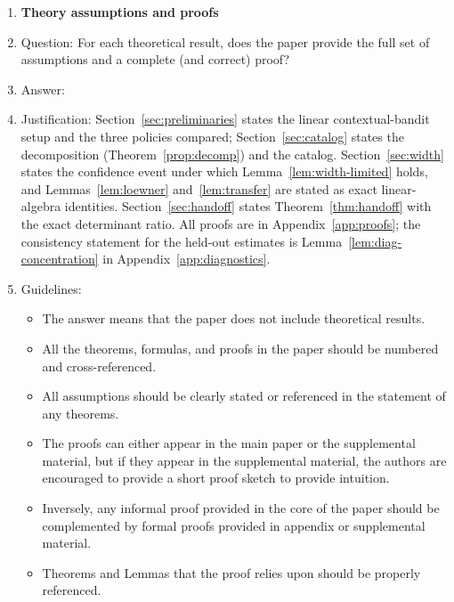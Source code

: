 \documentclass{article}
\theoremstyle{definition}
\theoremstyle{remark}
\theoremstyle{remark}
\begin{document}
\begin{enumerate}
\begin{itemize}
        \item If applicable, the authors should discuss possible limitations of their approach to address problems of privacy and fairness.
        \item While the authors might fear that complete honesty about limitations might be used by reviewers as grounds for rejection, a worse outcome might be that reviewers discover limitations that aren't acknowledged in the paper. The authors should use their best judgment and recognize that individual actions in favor of transparency play an important role in developing norms that preserve the integrity of the community. Reviewers will be specifically instructed to not penalize honesty concerning limitations.
    \end{itemize}

\item {\bf Theory assumptions and proofs}
    \item[] Question: For each theoretical result, does the paper provide the full set of assumptions and a complete (and correct) proof?
    \item[] Answer: \answerYes{} %
    \item[] Justification: Section~\ref{sec:preliminaries} states the linear contextual-bandit setup and the three policies compared; Section~\ref{sec:catalog} states the decomposition (Theorem~\ref{prop:decomp}) and the catalog. Section~\ref{sec:width} states the confidence event under which Lemma~\ref{lem:width-limited} holds, and Lemmas~\ref{lem:loewner} and~\ref{lem:transfer} are stated as exact linear-algebra identities. Section~\ref{sec:handoff} states Theorem~\ref{thm:handoff} with the exact determinant ratio. All proofs are in Appendix~\ref{app:proofs}; the consistency statement for the held-out estimates is Lemma~\ref{lem:diag-concentration} in Appendix~\ref{app:diagnostics}.
    \item[] Guidelines:
    \begin{itemize}
        \item The answer \answerNA{} means that the paper does not include theoretical results. 
        \item All the theorems, formulas, and proofs in the paper should be numbered and cross-referenced.
        \item All assumptions should be clearly stated or referenced in the statement of any theorems.
        \item The proofs can either appear in the main paper or the supplemental material, but if they appear in the supplemental material, the authors are encouraged to provide a short proof sketch to provide intuition. 
        \item Inversely, any informal proof provided in the core of the paper should be complemented by formal proofs provided in appendix or supplemental material.
        \item Theorems and Lemmas that the proof relies upon should be properly referenced. 
    \end{itemize}


\end{enumerate}
\end{document}

